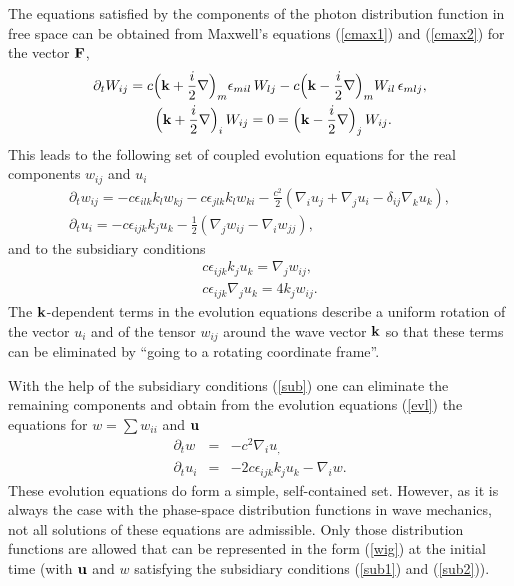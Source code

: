 \documentclass[11pt]{article}
\begin{document}
The equations satisfied by the components of the photon distribution
function in free space can be obtained from Maxwell's equations
(\ref{cmax1}) and (\ref{cmax2}) for the vector ${\bf F}$,
\begin{eqnarray}
\partial_t W_{ij} = c\Big({\bf k} + \frac{i}{2}{\bf
\nabla}\Big)_m \epsilon_{mil}\,W_{lj} - c\Big({\bf k} -
\frac{i}{2}{\bf \nabla}\Big)_m W_{il}\,\epsilon_{mlj},\\
\Big({\bf k} + \frac{i}{2}{\bf \nabla}\Big)_i\,W_{ij} = 0 = \Big({\bf k} -
\frac{i}{2}{\bf \nabla}\Big)_j\,W_{ij}.\hspace{25pt}
\end{eqnarray}
This leads to the following set of coupled evolution equations for the real
components $w_{ij}$ and $u_i$
\label{evl}
\begin{eqnarray}
 \partial_t w_{ij} = -c\epsilon_{ilk} k_l w_{kj}
 -c\epsilon_{jlk} k_l w_{ki} - \frac{c^2}{2}(\nabla_i u_j + \nabla_j u_i
 -\delta_{ij} \nabla_k u_k),\\
 \partial_t u_i = -c\epsilon_{ijk} k_j u_k - \frac{1}{2}
 (\nabla_j w_{ij} - \nabla_i w_{jj}),\hspace{100pt}
\end{eqnarray}
and to the subsidiary conditions
\label{sub}
\begin{eqnarray}
 c\epsilon_{ijk} k_j u_k = \nabla_j w_{ij},\label{sub1}\\
 c\epsilon_{ijk} \nabla_j u_k = 4k_j w_{ij}.\label{sub2}
\end{eqnarray}
The ${\bf k}$-dependent terms in the evolution equations describe a uniform
rotation of the vector $u_i$ and of the tensor $w_{ij}$ around the wave vector ${\bf k}$ so that these terms can be eliminated by ``going to a rotating coordinate frame''.

With the help of the subsidiary conditions (\ref{sub}) one can eliminate the
remaining components and obtain from the evolution equations (\ref{evl})
the equations for $w=\sum w_{ii}$ and ${\bf u}$
\begin{eqnarray}
\partial_t w &=& -c^2\nabla_i u_,\\
\partial_t u_i &=& -2c\epsilon_{ijk} k_j u_k - \nabla_i w.
\end{eqnarray}
These evolution equations do form a simple, self-contained set. However, as
it is always the case with the phase-space distribution functions in wave
mechanics, not all solutions of these equations are admissible. Only those
distribution functions are allowed that can be represented in the form
(\ref{wig}) at the initial time (with ${\bf u}$ and $w$ satisfying the
subsidiary conditions (\ref{sub1}) and (\ref{sub2})).
\end{document}
